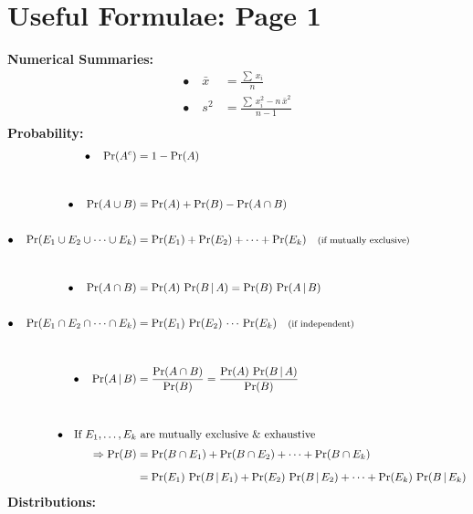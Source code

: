 \documentclass[12pt]{article}
\begin{document}
\section*{Useful Formulae: Page 1\\[0.3cm]}
{\bf Numerical Summaries:}\\[-0.8cm]
\begin{align*}
\bullet\quad \bar x &= \frac{\sum\,x_i}{n}\\[0.6cm]
\bullet\quad s^2 &= \frac{\sum\,x_i^2 - n\,\bar x^2}{n-1}\\
\end{align*}
{\bf Probability:}\\[-0.8cm]
\begin{align*}
\bullet\quad \Pr(A^c) &= 1 - \Pr(A) \\[1cm]
\bullet\quad \Pr(A \cup B) &= \Pr(A) + \Pr(B) - \Pr(A \cap B)\\[0.6cm]
\bullet\quad \Pr(E_1 \cup E_2 \cup \cdots \cup E_k) &= \Pr(E_1) + \Pr(E_2) + \cdots + \Pr(E_k) \text{\quad{\footnotesize(if mutually exclusive)}}\\[1cm]
\bullet\quad \Pr(A \cap B) &= \Pr(A) \, \Pr(B \, | \, A) = \Pr(B) \, \Pr(A \, | \, B) \\[0.6cm]
\bullet\quad \Pr(E_1 \cap E_2 \cap \cdots \cap E_k) &= \Pr(E_1) \, \Pr(E_2) \, \cdots \, \Pr(E_k) \text{\quad{\footnotesize(if independent)}}\\[1cm]
\bullet\quad \Pr(A\,|\,B) &= \frac{\Pr(A \cap B)}{\Pr(B)} = \frac{\Pr(A) \,\Pr(B\,|\,A)}{\Pr(B)}\\[1cm]
\bullet\quad \text{If $E_1,\ldots, E_k$} & \,\, \text{are mutually exclusive \& exhaustive}\\[0.1cm]
\Rightarrow \Pr(B) &= \Pr(B \cap E_1) + \Pr(B \cap E_2) + \cdots + \Pr(B \cap E_k) \\[0.2cm]
&= \Pr(E_1) \, \Pr(B\,|\,E_1) + \Pr(E_2) \, \Pr(B\,|\,E_2) + \cdots + \Pr(E_k) \, \Pr(B\,|\,E_k)\\
\end{align*}
{\bf Distributions:}\\[-0.8cm]
\end{document}
